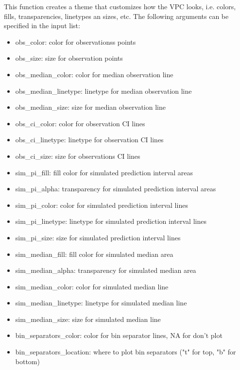 \documentclass[letterpaper]{book}
\begin{document}
\begin{Details}\relax
This function creates a theme that customizes how the VPC looks, i.e. colors, fills, transparencies, linetypes an sizes, etc. The following arguments can be specified in the input list:
\begin{itemize}

\item obs\_color: color for observationss points
\item obs\_size: size for observation points
\item obs\_median\_color: color for median observation line
\item obs\_median\_linetype: linetype for median observation line
\item obs\_median\_size: size for median observation line
\item obs\_ci\_color: color for observation CI lines
\item obs\_ci\_linetype: linetype for observation CI lines
\item obs\_ci\_size: size for observations CI lines
\item sim\_pi\_fill: fill color for simulated prediction interval areas
\item sim\_pi\_alpha: transparency for simulated prediction interval areas
\item sim\_pi\_color: color for simulated prediction interval lines
\item sim\_pi\_linetype: linetype for simulated prediction interval lines
\item sim\_pi\_size: size for simulated prediction interval lines
\item sim\_median\_fill: fill color for simulated median area
\item sim\_median\_alpha: transparency for simulated median area
\item sim\_median\_color: color for simulated median line
\item sim\_median\_linetype: linetype for simulated median line
\item sim\_median\_size: size for simulated median line
\item bin\_separators\_color: color for bin separator lines, NA for don't plot
\item bin\_separators\_location: where to plot bin separators ("t" for top, "b" for bottom)

\end{itemize}

\end{Details}
\end{document}
